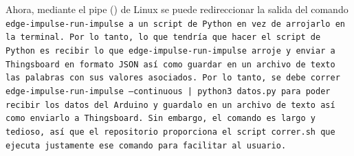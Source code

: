 Ahora, mediante el pipe (\textbar) de Linux \cite{pipe} se puede redireccionar la salida del comando \tt{edge-impulse-run-impulse} a un script de Python en vez de arrojarlo en la terminal. Por lo tanto, lo que tendría que hacer el script de Python es recibir lo que \tt{edge-impulse-run-impulse} arroje y enviar a Thingsboard en formato JSON así como guardar en un archivo de texto las palabras con sus valores asociados. Por lo tanto, se debe correr \tt{edge-impulse-run-impulse --continuous | python3 datos.py} para poder recibir los datos del Arduino y guardalo en un archivo de texto así como enviarlo a Thingsboard. Sin embargo, el comando es largo y tedioso, así que el repositorio proporciona el script \tt{correr.sh} que ejecuta justamente ese comando para facilitar al usuario.